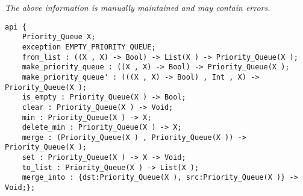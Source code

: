 \label{api:Priority\_Queue}

{\tiny \it The above information is manually maintained and may contain errors.}
\begin{verbatim}
api {
    Priority_Queue X;
    exception EMPTY_PRIORITY_QUEUE;
    from_list : ((X , X) -> Bool) -> List(X ) -> Priority_Queue(X );
    make_priority_queue : ((X , X) -> Bool) -> Priority_Queue(X );
    make_priority_queue' : (((X , X) -> Bool) , Int , X) -> Priority_Queue(X );
    is_empty : Priority_Queue(X ) -> Bool;
    clear : Priority_Queue(X ) -> Void;
    min : Priority_Queue(X ) -> X;
    delete_min : Priority_Queue(X ) -> X;
    merge : (Priority_Queue(X ) , Priority_Queue(X )) -> Priority_Queue(X );
    set : Priority_Queue(X ) -> X -> Void;
    to_list : Priority_Queue(X ) -> List(X );
    merge_into : {dst:Priority_Queue(X ), src:Priority_Queue(X )} -> Void;};
\end{verbatim}
